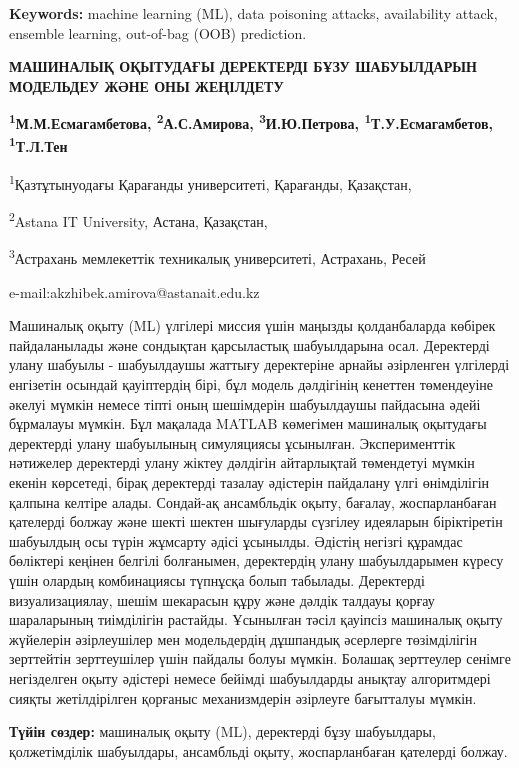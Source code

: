 {\bfseries Keywords:} machine learning (ML), data poisoning attacks,
availability attack, ensemble learning, out-of-bag (OOB) prediction.

{\bfseries МАШИНАЛЫҚ ОҚЫТУДАҒЫ ДЕРЕКТЕРДІ БҰЗУ ШАБУЫЛДАРЫН МОДЕЛЬДЕУ ЖӘНЕ
ОНЫ ЖЕҢІЛДЕТУ}

{\bfseries \textsuperscript{1}М.М.Есмагамбетова,
\textsuperscript{2}А.С.Амирова\textsuperscript{\envelope },
\textsuperscript{3}И.Ю.Петрова, \textsuperscript{1}Т.У.Есмагамбетов,
\textsuperscript{1}Т.Л.Тен}

\textsuperscript{1}Қазтұтынуодағы Қарағанды университеті, Қарағанды,
Қазақстан,

\textsuperscript{2}Astana IT University, Астана, Қазақстан,

\textsuperscript{3}Астрахань мемлекеттік техникалық университеті,
Астрахань, Ресей

e-mail:akzhibek.amirova@astanait.edu.kz

Машиналық оқыту (ML) үлгілері миссия үшін маңызды қолданбаларда көбірек
пайдаланылады және сондықтан қарсыластық шабуылдарына осал. Деректерді
улану шабуылы - шабуылдаушы жаттығу деректеріне арнайы әзірленген
үлгілерді енгізетін осындай қауіптердің бірі, бұл модель дәлдігінің
кенеттен төмендеуіне әкелуі мүмкін немесе тіпті оның шешімдерін
шабуылдаушы пайдасына әдейі бұрмалауы мүмкін. Бұл мақалада MATLAB
көмегімен машиналық оқытудағы деректерді улану шабуылының симуляциясы
ұсынылған. Эксперименттік нәтижелер деректерді улану жіктеу дәлдігін
айтарлықтай төмендетуі мүмкін екенін көрсетеді, бірақ деректерді тазалау
әдістерін пайдалану үлгі өнімділігін қалпына келтіре алады. Сондай-ақ
ансамбльдік оқыту, бағалау, жоспарланбаған қателерді болжау және шекті
шектен шығуларды сүзгілеу идеяларын біріктіретін шабуылдың осы түрін
жұмсарту әдісі ұсынылды. Әдістің негізгі құрамдас бөліктері кеңінен
белгілі болғанымен, деректердің улану шабуылдарымен күресу үшін олардың
комбинациясы түпнұсқа болып табылады. Деректерді визуализациялау, шешім
шекарасын құру және дәлдік талдауы қорғау шараларының тиімділігін
растайды. Ұсынылған тәсіл қауіпсіз машиналық оқыту жүйелерін
әзірлеушілер мен модельдердің дұшпандық әсерлерге төзімділігін
зерттейтін зерттеушілер үшін пайдалы болуы мүмкін. Болашақ зерттеулер
сенімге негізделген оқыту әдістері немесе бейімді шабуылдарды анықтау
алгоритмдері сияқты жетілдірілген қорғаныс механизмдерін әзірлеуге
бағытталуы мүмкін.

{\bfseries Түйін сөздер:} машиналық оқыту (ML), деректерді бұзу шабуылдары,
қолжетімділік шабуылдары, ансамбльді оқыту, жоспарланбаған қателерді
болжау.

